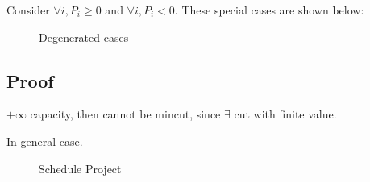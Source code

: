 \documentclass[a4paper]{report}
\theoremstyle{definition}
\begin{document}
Consider $\forall i, P_i \geq 0$ and $\forall i, P_i <0$. These special cases are shown below:

\begin{figure}[!htp]
\centering
{}
\caption{Degenerated cases}
\label{fig:scheduleprojectSpecial}
\end{figure} 

\subsection{Proof}

$+\infty$ capacity, then cannot be mincut, since $\exists$ cut with finite value.

In general case. 

\begin{figure}[!htp]
\centering
{}
\caption{Schedule Project}
\label{fig:scheduleproject}
\end{figure}
\end{document}
